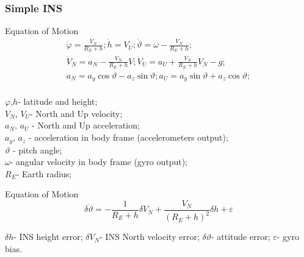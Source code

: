 \documentclass[compress]{beamer}    %
\begin{document}
\begin{frame}
\frametitle{Simple INS}

\begin{block}{Equation of Motion}
\begin{equation}
\begin{array}{l}
  \displaystyle \dot{\varphi }=\frac{V_{N} }{R_{E} +h} ; \dot{h}=V_{U} ; \dot{\vartheta }=\omega -\frac{V_{N} }{R_{E} +h} ;\\
  \displaystyle \dot{V}_{N} =a_{N} -\frac{V_{N} }{R_{E} +h} V; \dot{V}_{U} =a_{U} +\frac{V_{N} }{R_{E} +h} V_{N} -g;\\
  \displaystyle a_{N} =a_{y} \cos \vartheta -a_{z} \sin \vartheta ; a_{U} =a_{y} \sin \vartheta +a_{z} \cos \vartheta ;\\
  \end{array} 
  \label{eq:ins}
\end{equation}


\end{block}
{\tiny
$\varphi$,$h$- latitude and height; \\
$V_{N}$, $V_{U}$- North and Up velocity; \\
$a_{N}$, $a_{U}$ - North and Up acceleration; \\
$a_{y}$, $a_{z}$ - acceleration in body frame (accelerometers output); \\
$\vartheta$ - pitch angle;\\
$\omega $- angular velocity in body frame (gyro output); \\
$R_{E}$- Earth radius;}

\begin{block}{Equation of Motion}
\begin{equation}
 \delta \dot{\vartheta }=-\frac{1}{R_{E} +h} \delta V_{N} +\frac{V_{N} }{(R_{E} +h)^{2} } \delta h+\varepsilon
 \label{eq:ins_att}
\end{equation}
\end{block}
{\tiny
$\delta h$- INS height error; 
$\delta V_{N} $- INS North velocity error; 
$\delta \vartheta $- attitude error; 
$\varepsilon $- gyro bias.}
\end{frame}

\end{document}
